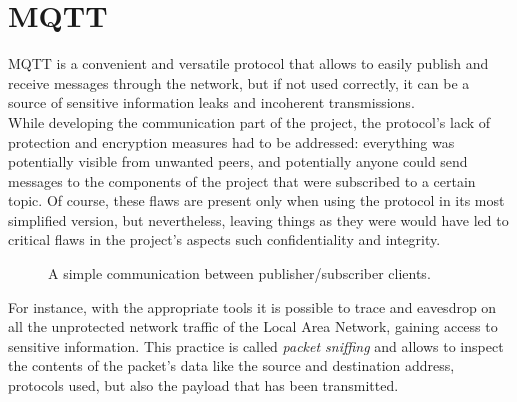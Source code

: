 \documentclass[target=bach,aauheader=,style=]{thud}
\begin{document}
\section{MQTT}

MQTT is a convenient and versatile protocol that allows to easily publish and receive messages through the network, but if not used correctly, it can be a source of sensitive information leaks and incoherent transmissions.\\
While developing the communication part of the project, the protocol's lack of protection and encryption measures had to be addressed: everything was potentially visible from unwanted peers, and potentially anyone could send messages to the components of the project that were subscribed to a certain topic.
Of course, these flaws are present only when using the protocol in its most simplified version, but nevertheless, leaving things as they were would have led to critical flaws in the project's aspects such confidentiality and integrity.
\newpage

\begin{figure}[h!]
	\centering
	\caption{A simple communication between publisher/subscriber clients.}
	\label{fig:plainsight}
\end{figure}

For instance, with the appropriate tools it is possible to trace and eavesdrop on all the unprotected network traffic of the Local Area Network, gaining access to sensitive information. 
This practice is called \emph{packet sniffing} and allows to inspect the contents of the packet's data like the source and destination address, protocols used, but also the payload that has been transmitted.\\
\end{document}
